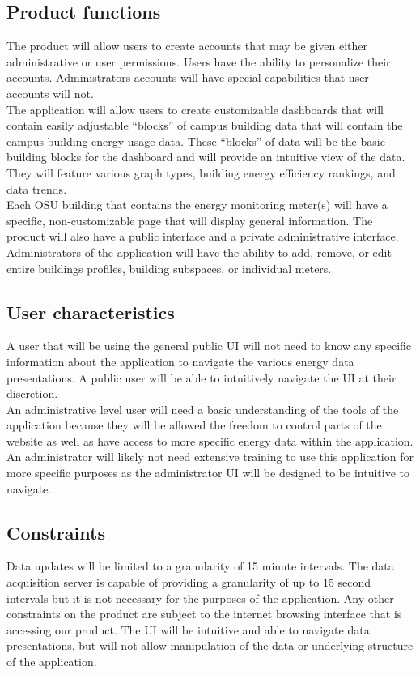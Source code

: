 \documentclass[onecolumn, draftclsnofoot,10pt, compsoc]{IEEEtran}
\begin{document}
\begin{enumerate}
    \subsection{Product functions}
    The product will allow users to create accounts that may be given either administrative or user permissions. Users have the ability to personalize their accounts. Administrators accounts will have special capabilities that user accounts will not. \\
    The application will allow users to create customizable dashboards that will contain easily adjustable “blocks” of campus building data that will contain the campus building energy usage data. These “blocks” of data will be the basic building blocks for the dashboard and will provide an intuitive view of the data. They will feature various graph types, building energy efficiency rankings, and data trends.\\
    Each OSU building that contains the energy monitoring meter(s) will have a specific, non-customizable page that will display general information. The product will also have a public interface and a private administrative interface.\\
    Administrators of the application will have the ability to add, remove, or edit entire buildings profiles, building subspaces, or individual meters.
    
    \subsection{User characteristics}
    A user that will be using the general public UI will not need to know any specific information about the application to navigate the various energy data presentations. A public user will be able to intuitively navigate the UI at their discretion. \\ 
    An administrative level user will need a basic understanding of the tools of the application because they will be allowed the freedom to control parts of the website as well as have access to more specific energy data within the application. An administrator will likely not need extensive training to use this application for more specific purposes as the administrator UI will be designed to be intuitive to navigate.
    \subsection{Constraints}
    Data updates will be limited to a granularity of 15 minute intervals. The data acquisition server is capable of providing a granularity of up to 15 second intervals but it is not necessary for the purposes of the application. Any other constraints on the product are subject to the internet browsing interface that is accessing our product. The UI will be intuitive and able to navigate data presentations, but will not allow manipulation of the data or underlying structure of the application.
    

\end{enumerate}
\end{document}
